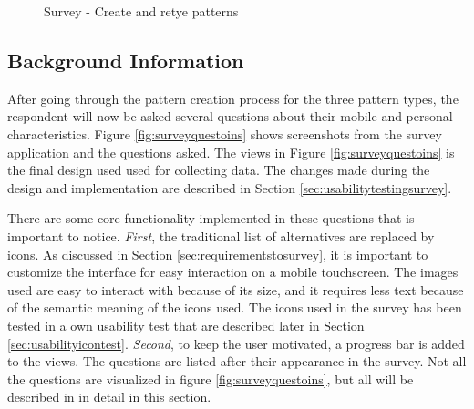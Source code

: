 \begin{figure}[H]
{        \label{fig:retypewrong}
      }
      \caption{Survey - Create and retye patterns}
      \label{fig:createandretypepatterns}
    \end{figure}

  \clearpage 

  \subsection{Background Information}
    After going through the pattern creation process for the three pattern types, the respondent will now be asked several questions about their mobile and personal characteristics. Figure \ref{fig:surveyquestoins} shows screenshots from the survey application and the questions asked. The views in Figure \ref{fig:surveyquestoins} is the final design used used for collecting data. The changes made during the design and implementation are described in Section \ref{sec:usabilitytestingsurvey}. 

    There are some core functionality implemented in these questions that is important to notice. {\it First}, the traditional list of alternatives are replaced by icons. As discussed in Section \ref{sec:requirementstosurvey}, it is important to customize the interface for easy interaction on a mobile touchscreen. The images used are easy to interact with because of its size, and it requires less text because of the semantic meaning of the icons used. The icons used in the survey has been tested in a own usability test that are described later in Section \ref{sec:usabilityicontest}. {\it Second}, to keep the user motivated, a progress bar is added to the views. The questions are listed after their appearance in the survey. Not all the questions are visualized in figure \ref{fig:surveyquestoins}, but all will be described in in detail in this section. 

